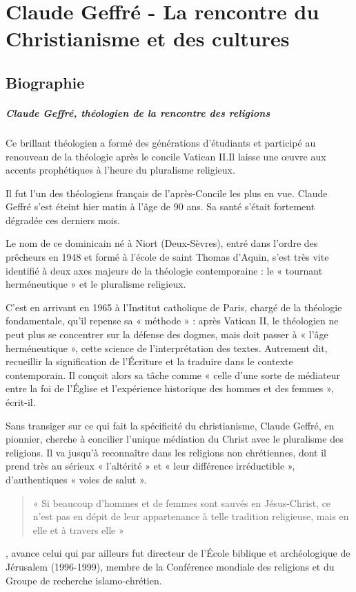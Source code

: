 \chapter{Claude Geffré - La rencontre du Christianisme et des cultures}


\section{Biographie}
\paragraph{Claude Geffré, théologien de la rencontre des religions} 
Ce brillant théologien a formé des générations d’étudiants et participé au renouveau de la théologie après le concile Vatican II.Il laisse une œuvre aux accents prophétiques à l’heure du pluralisme religieux.



Il fut l’un des théologiens français de l’après-Concile les plus en vue. Claude Geffré s’est éteint hier matin à l’âge de 90 ans. Sa santé s’était fortement dégradée ces derniers mois.

Le nom de ce dominicain né à Niort (Deux-Sèvres), entré dans l’ordre des prêcheurs en 1948 et formé à l’école de saint Thomas d’Aquin, s’est très vite identifié à deux axes majeurs de la théologie contemporaine : le « tournant herméneutique » et le pluralisme religieux.

C’est en arrivant en 1965 à l’Institut catholique de Paris, chargé de la théologie fondamentale, qu’il repense sa « méthode » : après Vatican II, le théologien ne peut plus se concentrer sur la défense des dogmes, mais doit passer à « l’âge herméneutique », cette science de l’interprétation des textes. Autrement dit, recueillir la signification de l’Écriture et la traduire dans le contexte contemporain. Il conçoit alors sa tâche comme « celle d’une sorte de médiateur entre la foi de l’Église et l’expérience historique des hommes et des femmes », écrit-il.

Sans transiger sur ce qui fait la spécificité du christianisme, Claude Geffré, en pionnier, cherche à concilier l’unique médiation du Christ avec le pluralisme des religions. Il va jusqu’à reconnaître dans les religions non chrétiennes, dont il prend très au sérieux « l’altérité » et « leur différence irréductible », d’authentiques « voies de salut ».
\begin{quote}
    « Si beaucoup d’hommes et de femmes sont sauvés en Jésus-Christ, ce n’est pas en dépit de leur appartenance à telle tradition religieuse, mais en elle et à travers elle »
\end{quote}
, avance celui qui par ailleurs fut directeur de l’École biblique et archéologique de Jérusalem (1996-1999), membre de la Conférence mondiale des religions et du Groupe de recherche islamo-chrétien.




